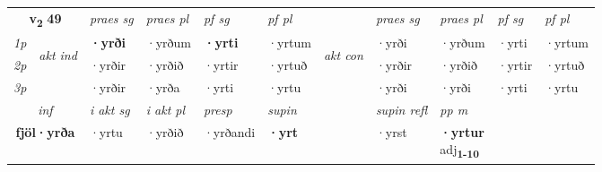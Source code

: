 \noindent
\begin{tabular}{lllllllllll} \toprule
\multicolumn{2}{c}{\textbf{v{\textsubscript{2}}} \Large{\textbf{49}}}  &  \textit{praes sg}  & \textit{praes pl}  &\textit{ pf sg} & \textit{pf pl} &  &  \textit{praes sg}  & \textit{praes pl}  & \textit{pf sg} & \textit{pf pl } \\*
	\cmidrule{3-6} \cmidrule{8-11}
 {\textit{1p}} & \multirow{3}{*}{\begin{turn}{90}\textit{akt ind}\end{turn}} & \textbf{·yrði} & ·yrðum & \textbf{·yrti} & ·yrtum & \multirow{3}{*}{\begin{turn}{90}\textit{akt con}\end{turn}} &·yrði & ·yrðum & ·yrti & ·yrtum\\*
 {\textit{2p}} &  &  ·yrðir  & ·yrðið & ·yrtir & ·yrtuð & & ·yrðir & ·yrðið & ·yrtir & ·yrtuð \\*
{\textit{3p}} &  & ·yrðir & ·yrða & ·yrti & ·yrtu & & ·yrði & ·yrði& ·yrti & ·yrtu \\*
\cmidrule{3-6} \cmidrule{8-11}

   \multicolumn{2}{c}{\textit{inf}}  & \textit{i akt sg} & \textit{i akt pl}   & \textit{presp} & \textit{supin} && \textit{supin refl} & \textit{pp m} \\*
  \multicolumn{2}{c}{\textbf{fjöl\allowbreak ·yrða}} & ·yrtu  & ·yrðið   & ·yrðandi &  \textbf{·yrt} && ·yrst & \specialcell{\textbf{·yrtur} \\ adj\textbf{\textsubscript{1-10}}} \\*
\end{tabular}

